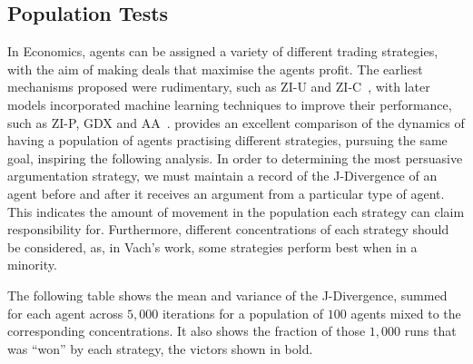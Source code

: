 \subsection{Population Tests}

In Economics, agents can be assigned a variety of different trading strategies, with the aim of making deals that maximise the agents profit. The earliest mechanisms proposed were rudimentary, such as ZI-U and ZI-C~\cite{Gode1993AllocativeRationality}, with later models incorporated machine learning techniques to improve their performance, such as ZI-P, GDX and AA~\cite{CliffMinimal-IntelligenceEnvironments, GjerstadPriceAuctions, Vytelingum2006TheAuction}. \cite{Vach2015ComparisonAgents} provides an excellent comparison of the dynamics of having a population of agents practising different strategies, pursuing the same goal, inspiring the following analysis. In order to determining the most persuasive argumentation strategy, we must maintain a record of the J-Divergence of an agent before and after it receives an argument from a particular type of agent. This indicates the amount of movement in the population each strategy can claim responsibility for. Furthermore, different concentrations of each strategy should be considered, as, in Vach's work, some strategies perform best when in a minority. 

The following table shows the mean and variance of the J-Divergence, summed for each agent across $5,000$ iterations for a population of $100$ agents mixed to the corresponding concentrations. It also shows the fraction of those $1,000$ runs that was ``won'' by each strategy, the victors shown in bold. 

